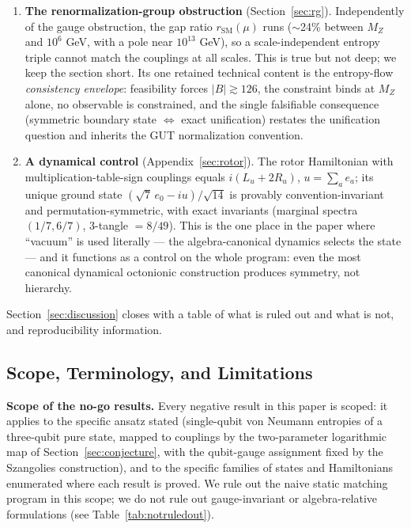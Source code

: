 \documentclass[11pt]{article}
\newcommand{\rSM}{r_{\mathrm{SM}}}
\begin{document}
\begin{enumerate}
\item \textbf{The renormalization-group obstruction} (Section~\ref{sec:rg}). Independently of the gauge obstruction, the gap ratio $\rSM(\mu)$ runs ($\sim$24\% between $M_Z$ and $10^6$ GeV, with a pole near $10^{13}$ GeV), so a scale-independent entropy triple cannot match the couplings at all scales. This is true but not deep; we keep the section short. Its one retained technical content is the entropy-flow \emph{consistency envelope}: feasibility forces $|B| \gtrsim 126$, the constraint binds at $M_Z$ alone, no observable is constrained, and the single falsifiable consequence (symmetric boundary state $\Leftrightarrow$ exact unification) restates the unification question and inherits the GUT normalization convention.

\item \textbf{A dynamical control} (Appendix~\ref{sec:rotor}). The rotor Hamiltonian with multiplication-table-sign couplings equals $i(L_u + 2R_u)$, $u = \sum_a e_a$; its unique ground state $(\sqrt{7}\,e_0 - iu)/\sqrt{14}$ is provably convention-invariant and permutation-symmetric, with exact invariants (marginal spectra $(1/7, 6/7)$, 3-tangle $= 8/49$). This is the one place in the paper where ``vacuum'' is used literally --- the algebra-canonical dynamics selects the state --- and it functions as a control on the whole program: even the most canonical dynamical octonionic construction produces symmetry, not hierarchy.

\end{enumerate}

Section~\ref{sec:discussion} closes with a table of what is ruled out and what is not, and reproducibility information.

\subsection{Scope, Terminology, and Limitations}
\label{sec:scope}

\textbf{Scope of the no-go results.} Every negative result in this paper is scoped: it applies to the specific ansatz stated (single-qubit von Neumann entropies of a three-qubit pure state, mapped to couplings by the two-parameter logarithmic map of Section~\ref{sec:conjecture}, with the qubit-gauge assignment fixed by the Szangolies construction), and to the specific families of states and Hamiltonians enumerated where each result is proved. We rule out the naive static matching program in this scope; we do not rule out gauge-invariant or algebra-relative formulations (see Table~\ref{tab:notruledout}).
\end{document}
